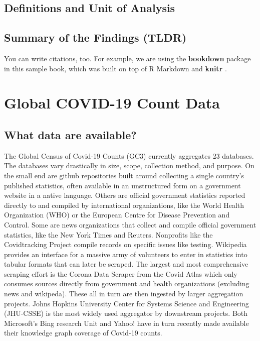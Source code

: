 \documentclass[
]{book}
\begin{document}
\hypertarget{definitions-and-unit-of-analysis}{%
\section{Definitions and Unit of Analysis}\label{definitions-and-unit-of-analysis}}

\hypertarget{summary-of-the-findings-tldr}{%
\section{Summary of the Findings (TLDR)}\label{summary-of-the-findings-tldr}}

You can write citations, too. For example, we are using the \textbf{bookdown} package \citep{R-bookdown} in this sample book, which was built on top of R Markdown and \textbf{knitr} \citep{xie2015}.

\hypertarget{global-covid-19-count-data}{%
\chapter{Global COVID-19 Count Data}\label{global-covid-19-count-data}}

\hypertarget{what-data-are-available}{%
\section{What data are available?}\label{what-data-are-available}}

The Global Census of Covid-19 Counts (GC3) currently aggregates 23 databases. The databases vary drastically in size, scope, collection method, and purpose. On the small end are github repositories built around collecting a single country's published statistics, often available in an unstructured form on a government website in a native language. Others are official government statistics reported directly to and compiled by international organizations, like the World Health Organization (WHO) or the European Centre for Disease Prevention and Control. Some are news organizations that collect and compile official government statistics, like the New York Times and Reuters. Nonprofits like the Covidtracking Project compile records on specific issues like testing. Wikipedia provides an interface for a massive army of volunteers to enter in statistics into tabular formats that can later be scraped. The largest and most comprehensive scraping effort is the Corona Data Scraper from the Covid Atlas which only consumes sources directly from government and health organizations (excluding news and wikipeda). These all in turn are then ingested by larger aggregation projects. Johns Hopkins University Center for Systems Science and Engineering (JHU-CSSE) is the most widely used aggregator by downstream projects. Both Microsoft's Bing research Unit and Yahoo! have in turn recently made available their knowledge graph coverage of Covid-19 counts.
\end{document}
